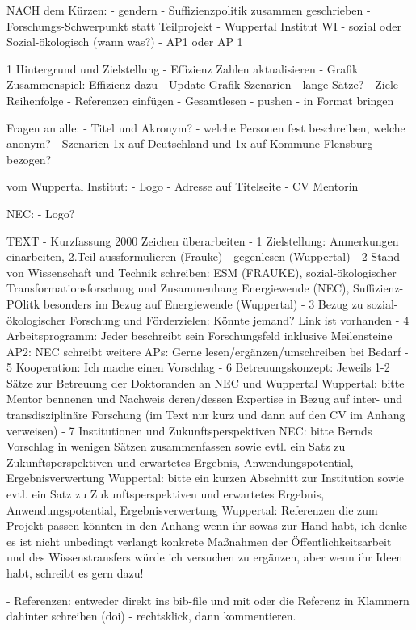 NACH dem Kürzen:
- gendern
- Suffizienzpolitik zusammen geschrieben
- Forschungs-Schwerpunkt statt Teilprojekt
- Wuppertal Institut WI
- sozial oder Sozial-ökologisch (wann was?)
- AP1 oder AP 1



1 Hintergrund und Zielstellung
- Effizienz Zahlen aktualisieren
- Grafik Zusammenspiel: Effizienz dazu
- Update Grafik Szenarien
- lange Sätze?
- Ziele Reihenfolge
- Referenzen einfügen
- Gesamtlesen
- pushen
- in Format bringen


Fragen an alle:
- Titel und Akronym?
- welche Personen fest beschreiben, welche anonym?
- Szenarien 1x auf Deutschland und 1x auf Kommune Flensburg bezogen?

vom Wuppertal Institut:
- Logo
- Adresse auf Titelseite
- CV Mentorin


NEC:
- Logo?


TEXT
- Kurzfassung 2000 Zeichen überarbeiten
- 1 Zielstellung: Anmerkungen einarbeiten, 2.Teil aussformulieren (Frauke) - gegenlesen (Wuppertal)
- 2 Stand von Wissenschaft und Technik schreiben: ESM (FRAUKE), sozial-ökologischer Transformationsforschung und Zusammenhang Energiewende (NEC), Suffizienz-POlitk besonders im Bezug auf Energiewende (Wuppertal)
- 3 Bezug zu sozial-ökologischer Forschung und Förderzielen: Könnte jemand? Link ist vorhanden
- 4 Arbeitsprogramm:
Jeder beschreibt sein Forschungsfeld inklusive Meilensteine
AP2: NEC schreibt
weitere APs: Gerne lesen/ergänzen/umschreiben bei Bedarf
- 5 Kooperation: Ich mache einen Vorschlag
- 6 Betreuungskonzept:
Jeweils 1-2 Sätze zur Betreuung der Doktoranden an NEC und Wuppertal
Wuppertal: bitte Mentor bennenen und Nachweis deren/dessen Expertise in Bezug auf inter- und transdisziplinäre Forschung (im Text nur kurz und dann auf den CV im Anhang verweisen)
- 7 Institutionen und Zukunftsperspektiven
NEC: bitte Bernds Vorschlag in wenigen Sätzen zusammenfassen sowie evtl. ein Satz zu Zukunftsperspektiven und erwartetes Ergebnis, Anwendungspotential, Ergebnisverwertung
Wuppertal: bitte ein kurzen Abschnitt zur Institution sowie evtl. ein Satz zu Zukunftsperspektiven und erwartetes Ergebnis, Anwendungspotential, Ergebnisverwertung
Wuppertal: Referenzen die zum Projekt passen könnten in den Anhang wenn ihr sowas zur Hand habt, ich denke es ist nicht unbedingt verlangt
konkrete Maßnahmen der Öffentlichkeitsarbeit und des Wissenstransfers würde ich versuchen zu ergänzen, aber wenn ihr Ideen habt, schreibt es gern dazu!


- Referenzen: entweder direkt ins bib-file und mit \cite{}  oder die Referenz in Klammern dahinter schreiben (doi)
- rechtsklick, dann kommentieren.